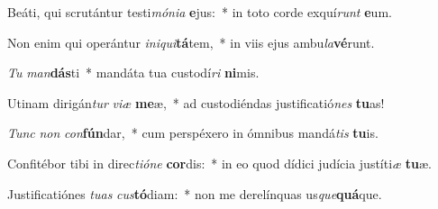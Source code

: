 \item Beáti, qui scrutántur testi\textit{mó}\textit{ni}\textit{a} \textbf{e}jus:~* in toto corde exquí\textit{runt} \textbf{e}um.
\item Non enim qui operántur \textit{in}\textit{i}\textit{qui}\textbf{tá}tem,~* in viis ejus ambu\textit{la}\textbf{vé}runt.
\item \textit{Tu} \textit{man}\textbf{dás}ti~* mandáta tua custodí\textit{ri} \textbf{ni}mis.
\item Utinam dirigán\textit{tur} \textit{vi}\textit{æ} \textbf{me}æ,~* ad custodiéndas justificatió\textit{nes} \textbf{tu}as!
\item \textit{Tunc} \textit{non} \textit{con}\textbf{fún}dar,~* cum perspéxero in ómnibus mandá\textit{tis} \textbf{tu}is.
\item Confitébor tibi in direc\textit{ti}\textit{ó}\textit{ne} \textbf{cor}dis:~* in eo quod dídici judícia justíti\textit{æ} \textbf{tu}æ.
\item Justificatiónes \textit{tu}\textit{as} \textit{cus}\textbf{tó}diam:~* non me derelínquas us\textit{que}\textbf{quá}que.
